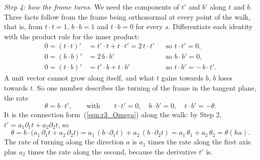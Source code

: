 \emph{Step 4: how the frame turns.} We need the components of $t'$ and $b'$ along $t$ and $b$. Three facts follow from the frame being orthonormal at every point of the walk, that is, from $t\cdot t = 1$, $b\cdot b = 1$ and $t\cdot b = 0$ for every $s$. Differentiate each identity with the product rule for the inner product:
\begin{align*}
0 = (t\cdot t)' &= t'\cdot t + t\cdot t' = 2\, t\cdot t' && \text{so } t\cdot t' = 0, \\
0 = (b\cdot b)' &= 2\, b\cdot b' && \text{so } b\cdot b' = 0, \\
0 = (t\cdot b)' &= t'\cdot b + t\cdot b' && \text{so } t\cdot b' = -\,b\cdot t' .
\end{align*}
A unit vector cannot grow along itself, and what $t$ gains towards $b$, $b$ loses towards $t$. So one number describes the turning of the frame in the tangent plane, the rate
\begin{equation*}
\theta = b\cdot t' , \qquad\text{with}\qquad t\cdot t' = 0, \quad b\cdot b' = 0, \quad t\cdot b' = -\theta .
\end{equation*}
It is the connection form~(\ref{eqn:r3_Omega}) along the walk: by Step 2, $t' = a_1\partial_1t + a_2\partial_2t$, so
\begin{equation*}
\theta = b\cdot\big(a_1\,\partial_1t + a_2\,\partial_2t\big) = a_1\,(b\cdot\partial_1t) + a_2\,(b\cdot\partial_2t) = a_1\,\theta_1 + a_2\,\theta_2 = \theta(ha) .
\end{equation*}
The rate of turning along the direction $a$ is $a_1$ times the rate along the first axis plus $a_2$ times the rate along the second, because the derivative $t'$ is.


